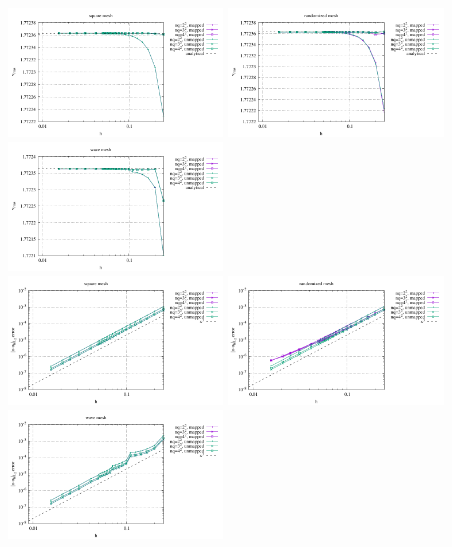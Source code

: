 \begin{center}
\includegraphics[width=5.7cm]{python_codes/fieldstone_76/results/bench9/reg/vrms}
\includegraphics[width=5.7cm]{python_codes/fieldstone_76/results/bench9/rand/vrms}
\includegraphics[width=5.7cm]{python_codes/fieldstone_76/results/bench9/wave/vrms}\\
\includegraphics[width=5.7cm]{python_codes/fieldstone_76/results/bench9/reg/errors_V}
\includegraphics[width=5.7cm]{python_codes/fieldstone_76/results/bench9/rand/errors_V}
\includegraphics[width=5.7cm]{python_codes/fieldstone_76/results/bench9/wave/errors_V}\\

\end{center}
